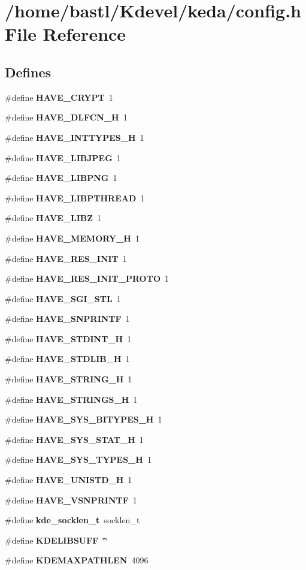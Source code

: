 \section{/home/bastl/Kdevel/keda/config.h File Reference}
\label{config_8h}
\subsection*{Defines}
\begin{CompactItemize}
\item 
\#define {\bf HAVE\_\-CRYPT}~1
\item 
\#define {\bf HAVE\_\-DLFCN\_\-H}~1
\item 
\#define {\bf HAVE\_\-INTTYPES\_\-H}~1
\item 
\#define {\bf HAVE\_\-LIBJPEG}~1
\item 
\#define {\bf HAVE\_\-LIBPNG}~1
\item 
\#define {\bf HAVE\_\-LIBPTHREAD}~1
\item 
\#define {\bf HAVE\_\-LIBZ}~1
\item 
\#define {\bf HAVE\_\-MEMORY\_\-H}~1
\item 
\#define {\bf HAVE\_\-RES\_\-INIT}~1
\item 
\#define {\bf HAVE\_\-RES\_\-INIT\_\-PROTO}~1
\item 
\#define {\bf HAVE\_\-SGI\_\-STL}~1
\item 
\#define {\bf HAVE\_\-SNPRINTF}~1
\item 
\#define {\bf HAVE\_\-STDINT\_\-H}~1
\item 
\#define {\bf HAVE\_\-STDLIB\_\-H}~1
\item 
\#define {\bf HAVE\_\-STRING\_\-H}~1
\item 
\#define {\bf HAVE\_\-STRINGS\_\-H}~1
\item 
\#define {\bf HAVE\_\-SYS\_\-BITYPES\_\-H}~1
\item 
\#define {\bf HAVE\_\-SYS\_\-STAT\_\-H}~1
\item 
\#define {\bf HAVE\_\-SYS\_\-TYPES\_\-H}~1
\item 
\#define {\bf HAVE\_\-UNISTD\_\-H}~1
\item 
\#define {\bf HAVE\_\-VSNPRINTF}~1
\item 
\#define {\bf kde\_\-socklen\_\-t}~socklen\_\-t
\item 
\#define {\bf KDELIBSUFF}~\char`\"{}\char`\"{}
\item 
\#define {\bf KDEMAXPATHLEN}~4096
\item 

\end{CompactItemize}
